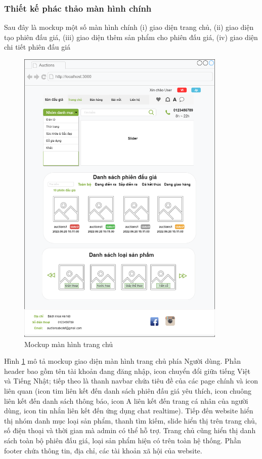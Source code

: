\documentclass[../DoAn.tex]{subfiles}
\begin{document}
\subsubsection{Thiết kế phác thảo màn hình chính}
Sau đây là mockup một số màn hình chính (i) giao diện trang chủ, (ii) giao diện tạo phiên đấu giá, (iii) giao diện thêm sản phẩm cho phiên đấu giá, (iv) giao diện chi tiết phiên đấu giá
\begin{figure}[H]
    \centering
    \includegraphics[width=0.75\linewidth,height=14.5cm]{Hinhve/homepage.png}
    \caption{Mockup màn hình trang chủ}
    \label{fig:Fig48}
\end{figure}
Hình \ref{fig:Fig48} mô tả mockup giao diện màn hình trang chủ phía Người dùng. Phần header bao gồm tên tài khoản đang đăng nhập, icon chuyển đổi giữa tiếng Việt và Tiếng Nhật; tiếp theo là thanh navbar chứa tiêu đề của các page chính và icon liên quan (icon tim liên kết đến danh sách phiên đấu giá yêu thích, icon chuông liên kết đến danh sách thông báo, icon A liên kết đến trang cá nhân của người dùng, icon tin nhắn liên kết đến ứng dụng chat realtime). Tiếp đến website hiển thị nhóm danh mục loại sản phẩm, thanh tìm kiếm, slide hiển thị trên trang chủ, số điện thoại và thời gian mà admin có thể hỗ trợ. Trang chủ cũng hiển thị danh sách toàn bộ phiên đấu giá, loại sản phẩm hiện có trên toàn hệ thống. Phần footer chứa thông tin, địa chỉ, các tài khoản xã hội của website.
\end{document}
